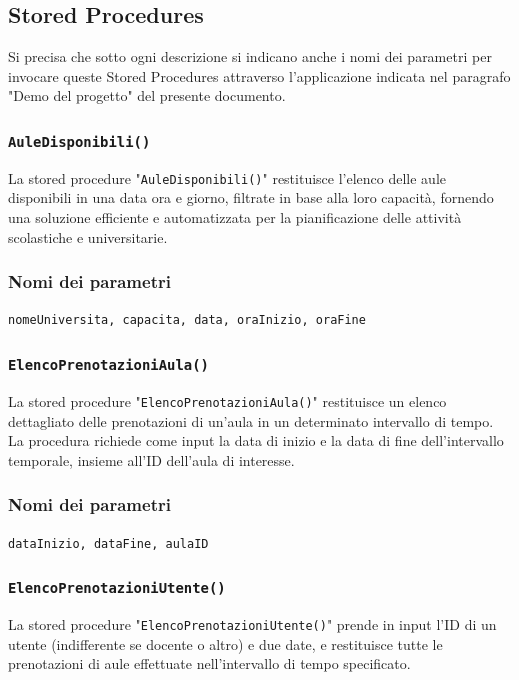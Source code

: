 \documentclass[a4paper, 10pt, oneside]{article} %
\begin{document}
\subsection{Stored Procedures}

Si precisa che sotto ogni descrizione si indicano anche i nomi dei parametri per invocare queste Stored Procedures attraverso l'applicazione indicata nel paragrafo "Demo del progetto" del presente documento. 

\subsubsection*{\texttt{AuleDisponibili()}}


La stored procedure "\texttt{AuleDisponibili()}" restituisce l'elenco delle aule disponibili in una data ora e giorno, filtrate in base alla loro capacità, fornendo una soluzione efficiente e automatizzata per la pianificazione delle attività scolastiche e universitarie.

\subsubsection*{Nomi dei parametri}

\texttt{nomeUniversita, capacita, data, oraInizio, oraFine}

\subsubsection*{\texttt{ElencoPrenotazioniAula()}}

La stored procedure "\texttt{ElencoPrenotazioniAula()}" restituisce un elenco dettagliato delle prenotazioni di un'aula in un determinato intervallo di tempo. La procedura richiede come input la data di inizio e la data di fine dell'intervallo temporale, insieme all'ID dell'aula di interesse.

\subsubsection*{Nomi dei parametri}

\texttt{dataInizio, dataFine, aulaID}

\subsubsection*{\texttt{ElencoPrenotazioniUtente()}}

La stored procedure "\texttt{ElencoPrenotazioniUtente()}" prende in input l'ID di un utente (indifferente se docente o altro) e due date, e restituisce tutte le prenotazioni di aule effettuate nell'intervallo di tempo specificato.
\end{document}
